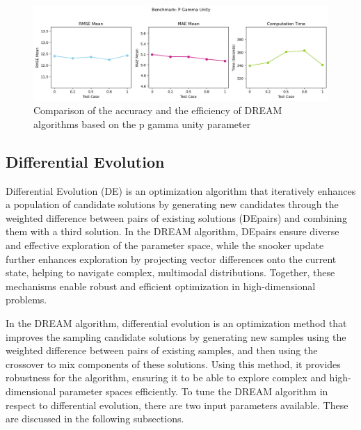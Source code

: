 \begin{figure}[H]
    \centering
    \includegraphics[width=1\textwidth]{figures/dream/gamma.png}
    \captionsetup{width=.8\textwidth}
    \caption{Comparison of the accuracy and the efficiency of DREAM algorithms based on the p gamma unity parameter}
    \label{fig:enter-label}
\end{figure}

\subsection{Differential Evolution}
Differential Evolution (DE) is an optimization algorithm that iteratively enhances a population of candidate solutions by generating new candidates through the weighted difference between pairs of existing solutions (DEpairs) and combining them with a third solution. In the DREAM algorithm, DEpairs ensure diverse and effective exploration of the parameter space, while the snooker update further enhances exploration by projecting vector differences onto the current state, helping to navigate complex, multimodal distributions. Together, these mechanisms enable robust and efficient optimization in high-dimensional problems.

In the DREAM algorithm, differential evolution is an optimization method that improves the sampling candidate solutions by generating new samples using the weighted difference between pairs of existing samples, and then using the crossover to mix components of these solutions. Using this method, it provides robustness for the algorithm, ensuring it to be able to explore complex and high-dimensional parameter spaces efficiently. To tune the DREAM algorithm in respect to differential evolution, there are two input parameters available. These are discussed in the following subsections.

